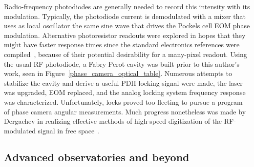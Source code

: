 Radio-frequency photodiodes are generally needed to record this intensity with its modulation.
Typically, the photodiode current is demodulated with a mixer that uses as local oscillator the same sine wave that drives the Pockels cell EOM phase modulation.
Alternative photoresistor readouts were explored in hopes that they might have faster response times since the standard electronics references were compiled~\cite{HorowitzHill1989,Simpson}, because of their potential desirability for a many-pixel readout.
Using the usual RF photodiode, a Fabry-Perot cavity was built prior to this author's work, seen in Figure~\ref{phase_camera_optical_table}.
Numerous attempts to stabilize the cavity and derive a useful PDH locking signal were made, the laser was upgraded, EOM replaced, and the analog locking system frequency response was characterized.
Unfortunately, locks proved too fleeting to pursue a program of phase camera angular measurements.
Much progress nonetheless was made by Dergachev in realizing effective methods of high-speed digitization of the RF-modulated signal in free space~\cite{DergachevThesis}.


        \subsection{Advanced observatories and beyond}
        \label{advanced}
  
